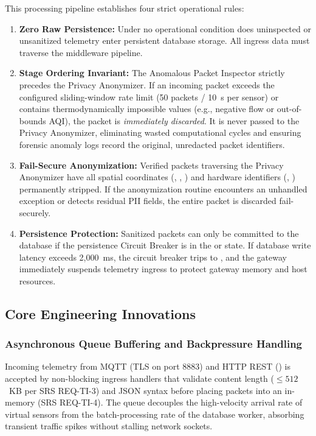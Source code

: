 \documentclass[a4paper]{article}
\begin{document}
This processing pipeline establishes four strict operational rules:
\begin{enumerate}[label=(\roman*)]
    \item \textbf{Zero Raw Persistence:} Under no operational condition does uninspected or unsanitized telemetry enter persistent database storage. All ingress data must traverse the middleware pipeline.
    \item \textbf{Stage Ordering Invariant:} The Anomalous Packet Inspector strictly precedes the Privacy Anonymizer. If an incoming packet exceeds the configured sliding-window rate limit (50 packets / 10~s per sensor) or contains thermodynamically impossible values (e.g., negative flow or out-of-bounds AQI), the packet is \emph{immediately discarded}. It is never passed to the Privacy Anonymizer, eliminating wasted computational cycles and ensuring forensic anomaly logs record the original, unredacted packet identifiers.
    \item \textbf{Fail-Secure Anonymization:} Verified packets traversing the Privacy Anonymizer have all spatial coordinates (, , ) and hardware identifiers (, ) permanently stripped. If the anonymization routine encounters an unhandled exception or detects residual PII fields, the entire packet is discarded fail-securely.
    \item \textbf{Persistence Protection:} Sanitized packets can only be committed to the database if the persistence Circuit Breaker is in the  or  state. If database write latency exceeds 2,000~ms, the circuit breaker trips to , and the gateway immediately suspends telemetry ingress to protect gateway memory and host resources.
\end{enumerate}

\subsection{Core Engineering Innovations}

\subsubsection{Asynchronous Queue Buffering and Backpressure Handling}
Incoming telemetry from MQTT (TLS on port 8883) and HTTP REST () is accepted by non-blocking ingress handlers that validate content length ($\le 512$~KB per SRS REQ-TI-3) and JSON syntax before placing packets into an in-memory  (SRS REQ-TI-4). The queue decouples the high-velocity arrival rate of virtual sensors from the batch-processing rate of the database worker, absorbing transient traffic spikes without stalling network sockets.
\end{document}
